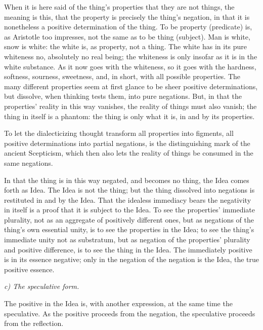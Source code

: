 \documentclass[12pt]{book}
\begin{document}
When it is here said of the thing's properties that they are not things, the meaning is this, that the
property is precisely the thing's negation, in that it is nonetheless a positive determination of the
thing. To be property (predicate) is, as Aristotle too impresses, not the same as to be thing
(subject). Man is white, snow is white: the white is, as property, not a thing. The white has in its
pure whiteness no, absolutely no real being; the whiteness is only insofar as it is in the white
substance. As it now goes with the whiteness, so it goes with the hardness, softness, sourness,
sweetness, and, in short, with all possible properties. The many different properties seem at first
glance to be sheer positive determinations, but dissolve, when
thinking tests them, into pure negations. But, in that the properties' reality in this way vanishes,
the reality of things must also vanish; the thing in itself is a phantom: the thing is only what it is,
in and by its properties.

To let the dialecticizing thought transform all properties into figments, all positive determinations
into partial negations, is the distinguishing mark of the ancient Scepticism, which then also lets the
reality of things be consumed in the same negations.

In that the thing is in this way negated, and becomes no thing, the Idea comes forth as Idea. The Idea
is not the thing; but the thing dissolved into negations is restituted in and by the Idea. That the
idealess immediacy bears the negativity in itself is a proof that it is subject to the Idea. To see the
properties' immediate plurality, not as an aggregate of positively different ones, but as negations of
the thing's own essential unity, is to see the properties in the Idea; to see the thing's immediate
unity not as substratum, but as negation of the properties' plurality and positive difference, is to
see the thing in the Idea. The immediately positive is in its essence negative; only in the negation of
the negation is the Idea, the true positive essence.

\emph{c) The speculative form.}

The positive in the Idea is, with another expression, at the same time the speculative. As the positive
proceeds from the negation, the speculative proceeds from the reflection.
\end{document}
